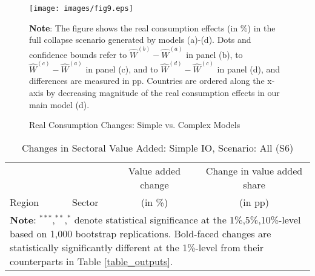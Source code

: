 \documentclass[a4paper,12pt]{article}
\begin{document}
\begin{figure}[h!]
\centering
\caption{Real Consumption Changes: Simple vs. Complex Models}
\vspace{0.25cm}
\label{fig:fourway}
\texttt{[image: images/fig9.eps]}\\
\begin{fignote}{\textwidth}{\scriptsize{\textbf{Note}: The figure shows the real consumption effects (in \%) in the full collapse scenario generated by models (a)-(d). Dots and confidence bounds refer to $\hat W^{(b)}-\hat W^{(a)}$ in panel (b), to $\hat W^{(c)}-\hat W^{(a)}$ in panel (c), and to $\hat W^{(d)}-\hat W^{(c)}$ in panel (d), and differences are measured in pp. Countries are ordered along the x-axis by decreasing magnitude of the real consumption effects in our main model (d).}}
\end{fignote}
\end{figure}





\renewcommand{\tabcolsep}{.7cm}

\begin{table}[h!]\vspace*{-0cm}
\centering
	\caption{Changes in Sectoral Value Added: Simple IO, Scenario: All (S6)}\label{table_outputs_gfake}
	\vspace{0.25cm}
{\footnotesize
\begin{tabular}{lccc}
\toprule
&& \multicolumn{1}{c}{Value added change} &\multicolumn{1}{c}{Change in value added share}\\
Region & Sector & (in \%) & (in pp) \\
\midrule

\bottomrule
\multicolumn{4}{l}{\parbox[t]{6in}{\scriptsize{\textbf{Note}: $^{***}$,$^{**}$,$^{*}$ denote statistical significance at the 1\%,5\%,10\%-level based on 1,000 bootstrap replications. Bold-faced changes are statistically significantly different at the 1\%-level from their counterparts in Table \ref{table_outputs}.}}}
\end{tabular}
}
\end{table}




\newpage

%
%
\end{document}

